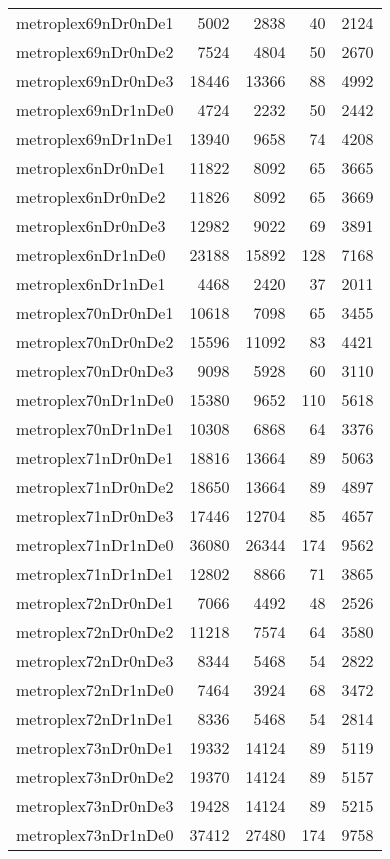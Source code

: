 \begin{tabular}{lrrrr}
metroplex69nDr0nDe1 & 5002 & 2838 & 40 & 2124 \\
metroplex69nDr0nDe2 & 7524 & 4804 & 50 & 2670 \\
metroplex69nDr0nDe3 & 18446 & 13366 & 88 & 4992 \\
metroplex69nDr1nDe0 & 4724 & 2232 & 50 & 2442 \\
metroplex69nDr1nDe1 & 13940 & 9658 & 74 & 4208 \\
metroplex6nDr0nDe1 & 11822 & 8092 & 65 & 3665 \\
metroplex6nDr0nDe2 & 11826 & 8092 & 65 & 3669 \\
metroplex6nDr0nDe3 & 12982 & 9022 & 69 & 3891 \\
metroplex6nDr1nDe0 & 23188 & 15892 & 128 & 7168 \\
metroplex6nDr1nDe1 & 4468 & 2420 & 37 & 2011 \\
metroplex70nDr0nDe1 & 10618 & 7098 & 65 & 3455 \\
metroplex70nDr0nDe2 & 15596 & 11092 & 83 & 4421 \\
metroplex70nDr0nDe3 & 9098 & 5928 & 60 & 3110 \\
metroplex70nDr1nDe0 & 15380 & 9652 & 110 & 5618 \\
metroplex70nDr1nDe1 & 10308 & 6868 & 64 & 3376 \\
metroplex71nDr0nDe1 & 18816 & 13664 & 89 & 5063 \\
metroplex71nDr0nDe2 & 18650 & 13664 & 89 & 4897 \\
metroplex71nDr0nDe3 & 17446 & 12704 & 85 & 4657 \\
metroplex71nDr1nDe0 & 36080 & 26344 & 174 & 9562 \\
metroplex71nDr1nDe1 & 12802 & 8866 & 71 & 3865 \\
metroplex72nDr0nDe1 & 7066 & 4492 & 48 & 2526 \\
metroplex72nDr0nDe2 & 11218 & 7574 & 64 & 3580 \\
metroplex72nDr0nDe3 & 8344 & 5468 & 54 & 2822 \\
metroplex72nDr1nDe0 & 7464 & 3924 & 68 & 3472 \\
metroplex72nDr1nDe1 & 8336 & 5468 & 54 & 2814 \\
metroplex73nDr0nDe1 & 19332 & 14124 & 89 & 5119 \\
metroplex73nDr0nDe2 & 19370 & 14124 & 89 & 5157 \\
metroplex73nDr0nDe3 & 19428 & 14124 & 89 & 5215 \\
metroplex73nDr1nDe0 & 37412 & 27480 & 174 & 9758 \\

\end{tabular}
